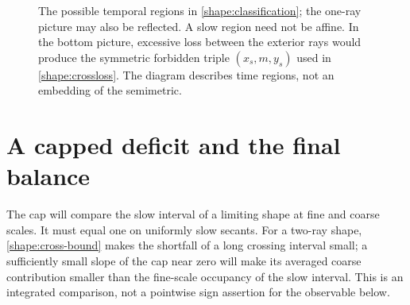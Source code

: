 \begin{figure}[tb]
\centering
{}
\caption{The possible temporal regions in \cref{shape:classification};
the one-ray picture may also be reflected.  A slow region need not be
affine.  In the bottom picture, excessive loss between the exterior rays
would produce the symmetric forbidden triple $(x_s,m,y_s)$ used in
\cref{shape:crossloss}.  The diagram describes time regions, not an
embedding of the semimetric.}
\label{shape:figure}
\end{figure}

\FloatBarrier
\section{A capped deficit and the final balance}
\label{end:section}

The cap will compare the slow interval of a limiting shape at fine and
coarse scales. It must equal one on uniformly slow secants. For a
two-ray shape, \cref{shape:cross-bound} makes the shortfall of a long
crossing interval small; a sufficiently small slope of the cap near
zero will make its averaged coarse contribution smaller than the
fine-scale occupancy of the slow interval. This is an integrated
comparison, not a pointwise sign assertion for the observable below.

